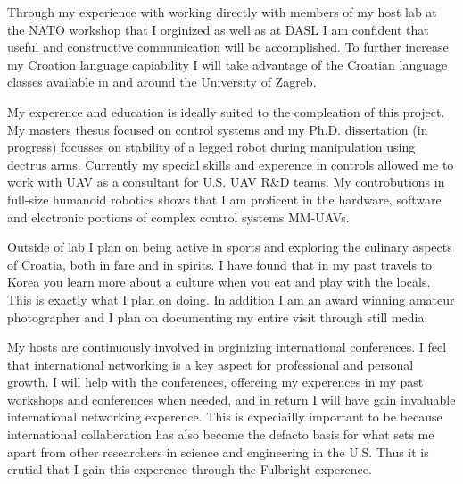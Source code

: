\documentclass[12pt]{article}
\begin{document}
Through my experience with working directly with members of my host lab at the NATO workshop that I orginized as well as at DASL I am confident that useful and constructive communication will be accomplished.  
To further increase my Croation language capiability I will take advantage of the Croatian language classes available in and around the University of Zagreb. 

My experence and education is ideally suited to the compleation of this project.  
My masters thesus focused on control systems and my Ph.D. dissertation (in progress) focusses on stability of a legged robot during manipulation using dectrus arms.  
Currently my special skills and experence in controls allowed me to work with UAV as a consultant for U.S. UAV R\&D teams.
My controbutions in full-size humanoid robotics shows that I am proficent in the hardware, software and electronic portions of complex control systems MM-UAVs.


Outside of lab I plan on being active in sports and exploring the culinary aspects of Croatia, both in fare and in spirits.  
I have found that in my past travels to Korea you learn more about a culture when you eat and play with the locals.  
This is exactly what I plan on doing.  
In addition I am an award winning amateur photographer and I plan on documenting my entire visit through still media.

My hosts are continuously involved in orginizing international conferences.  
I feel that international networking is a key aspect for professional and personal growth.
I will help with the conferences, offereing my experences in my past workshops and conferences when needed, and in return I will have gain invaluable international networking experence.
This is expeciailly important to be because international collaberation has also become the defacto basis for what sets me apart from other researchers in science and engineering in the U.S. 
Thus it is crutial that I gain this experence through the Fulbright experence.
\end{document}

